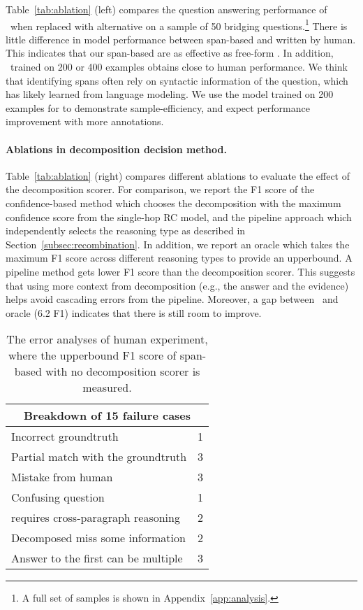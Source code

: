 Table~\ref{tab:ablation} (left) compares the question answering performance of \sys\ when replaced with alternative \queries{} on a sample of 50 bridging questions.\footnote{A full set of samples is shown in Appendix~\ref{app:analysis}.}
There is little difference in model performance between span-based and \queries{} written by human.
This indicates that our span-based \queries{} are as effective as free-form \queries{}.
In addition, ~trained on 200 or 400 examples obtains close to human performance.
We think that identifying spans often rely on syntactic information of the question, which \bert{} has likely learned from language modeling.
We use the model trained on 200 examples for \sys{} to demonstrate sample-efficiency, and expect performance improvement with more annotations.



\vspace{-.1cm}
\paragraph{Ablations in decomposition decision method.}
Table~\ref{tab:ablation} (right) compares different ablations to evaluate the effect of the decomposition scorer.
For comparison, we report the F1 score of the confidence-based method which chooses the decomposition with the maximum confidence score from the single-hop RC model, and the pipeline approach which independently selects the reasoning type as described in Section~\ref{subsec:recombination}.
In addition, we report an oracle which takes the maximum F1 score across different reasoning types to provide an upperbound. 
A pipeline method gets lower F1 score than the decomposition scorer.
This suggests that using more context from decomposition (e.g., the answer and the evidence) helps avoid cascading errors from the pipeline.
Moreover, a gap between \sys\ and oracle (6.2 F1) indicates that there is still room to improve.


\begin{table}[t]
    \centering
    \small
    \begin{tabular}{lc}
        \toprule
        \multicolumn{2}{c}{Breakdown of 15 failure cases} \\
        \midrule
        Incorrect groundtruth & 1  \\
        Partial match with the groundtruth & 3 \\
        Mistake from human & 3 \\
        Confusing question & 1\\
        \Query{} requires cross-paragraph reasoning & 2\\
        Decomposed \queries{} miss some information & 2  \\
        Answer to the first \query{} can be multiple & 3\\
        \bottomrule              
    \end{tabular}
    \caption{
    The error analyses of human experiment, where the upperbound F1 score of span-based \queries{} with no decomposition scorer is measured.
    }
    \label{tab:upperbound-breakdown}
\end{table}


